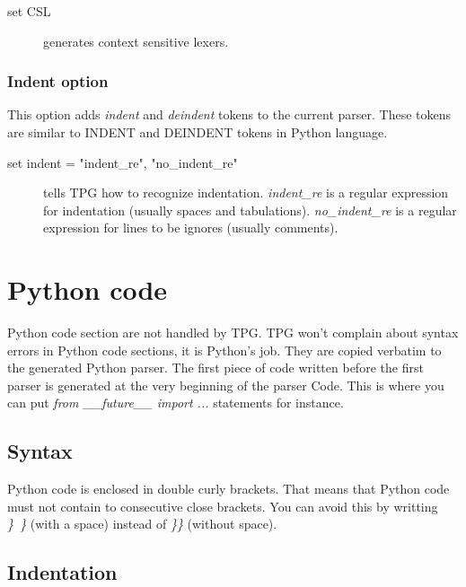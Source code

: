 \begin{description}
	\item [set CSL] generates context sensitive lexers.
\end{description}

\subsubsection{Indent option}                               \label{grammar:indent_option}

This option adds \emph{indent} and \emph{deindent} tokens to the current parser.
These tokens are similar to INDENT and DEINDENT tokens in Python language.

\begin{description}
    \item [set indent = "indent\_re", "no\_indent\_re"] tells TPG how to recognize indentation.
        \emph{indent\_re} is a regular expression for indentation (usually spaces and tabulations).
        \emph{no\_indent\_re} is a regular expression for lines to be ignores (usually comments).
\end{description}

\section{Python code}										\label{grammar:code}

Python code section are not handled by TPG.
TPG won't complain about syntax errors in Python code sections, it is Python's job.
They are copied verbatim to the generated Python parser.
The first piece of code written before the first parser is generated at the very beginning of the parser Code.
This is where you can put \emph{from \_\_future\_\_ import ...} statements for instance.

\subsection{Syntax}

Python code is enclosed in double curly brackets.
That means that Python code must not contain to consecutive close brackets.
You can avoid this by writting \emph{\}~\}} (with a space) instead of \emph{\}\}} (without space).

\subsection{Indentation}

